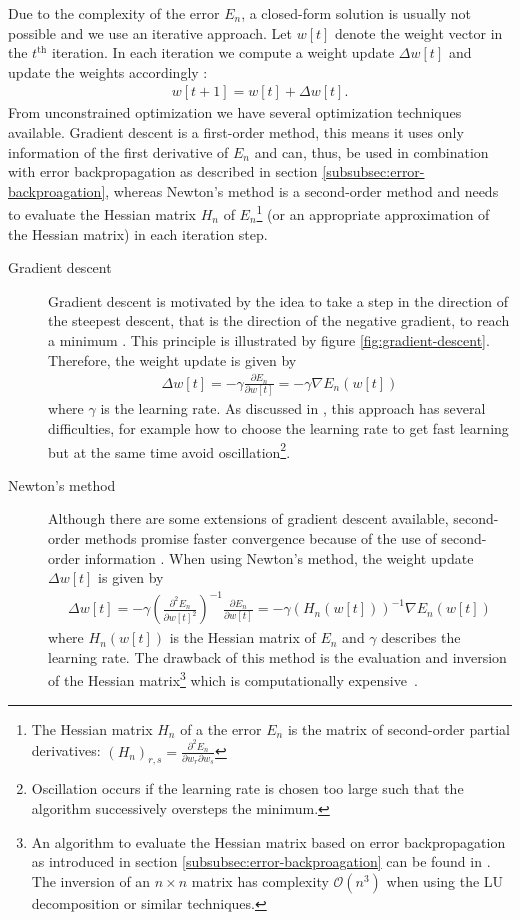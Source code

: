 Due to the complexity of the error $E_n$, a closed-form solution is usually not possible and we use an iterative approach. Let $w[t]$ denote the weight vector in the $t^{\text{th}}$ iteration. In each iteration we compute a weight update $\Delta w[t]$ and update the weights accordingly \cite[p.~236-237]{Bishop:2006}:
\begin{align}
	w[t+1] = w[t] + \Delta w[t].
\end{align}
From unconstrained optimization we have several optimization techniques available. Gradient descent is a first-order method, this means it uses only information of the first derivative of $E_n$ and can, thus, be used in combination with error backpropagation as described in section \ref{subsubsec:error-backproagation}, whereas Newton's method is a second-order method and needs to evaluate the Hessian matrix $H_n$ of $E_n$\footnote{The Hessian matrix $H_n$ of a the error $E_n$ is the matrix of second-order partial derivatives: $\left(H_n\right)_{r,s} = \frac{\partial^2 E_n}{\partial w_r \partial w_s}$} (or an appropriate approximation of the Hessian matrix) in each iteration step.
\begin{description}
	\item[Gradient descent] Gradient descent is motivated by the idea to take a step in the direction of the steepest descent, that is the direction of the negative gradient, to reach a minimum \cite[p.~263-267]{Bishop:1995}. This principle is illustrated by figure \ref{fig:gradient-descent}. Therefore, the weight update is given by
		\begin{align}
			\Delta w[t] = - \gamma \frac{\partial E_n}{\partial w[t]} = - \gamma \nabla E_n (w[t])
		\end{align}
		where $\gamma$ is the learning rate. As discussed in \cite[p.263-272]{Bishop:2006}, this approach has several difficulties, for example how to choose the learning rate to get fast learning but at the same time avoid oscillation\footnote{Oscillation occurs if the learning rate is chosen too large such that the algorithm successively oversteps the minimum.}.
	\item[Newton's method] Although there are some extensions of gradient descent available, second-order methods promise faster convergence because of the use of second-order information \cite{BeckerLeCun:1989}. When using Newton's method, the weight update $\Delta w[t]$ is given by
	\begin{align}
		\Delta w[t] = - \gamma \left(\frac{\partial^2 E_n}{\partial w[t]^2}\right)^{-1} \frac{\partial E_n}{\partial w[t]} = - \gamma \left(H_n(w[t])\right)^{-1} \nabla E_n(w[t])
	\end{align}
	where $H_n(w[t])$ is the Hessian matrix of $E_n$ and $\gamma$ describes the learning rate. The drawback of this method is the evaluation and inversion of the Hessian matrix\footnote{An algorithm to evaluate the Hessian matrix based on error backpropagation as introduced in section \ref{subsubsec:error-backproagation} can be found in \cite{Bishop:1992}. The inversion of an $n \times n$ matrix has complexity $\mathcal{O}(n^3)$ when using the LU decomposition or similar techniques.} which is computationally expensive~\cite{BeckerLeCun:1989}.
\end{description}

